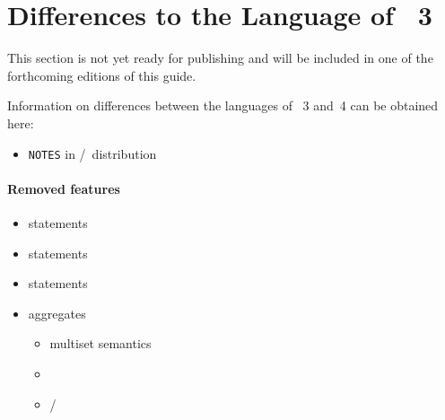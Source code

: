 \section{Differences to the Language of \gringo~3}\label{sec:gringo:tri}

This section is not yet ready for publishing
and will be included in one of the forthcoming editions of this guide.

Information on differences between the languages of \gringo~3 and~4 can be obtained here:
\begin{itemize}
\item \texttt{NOTES} in \gringo/\clingo\ distribution
\end{itemize}

\paragraph{Removed features}
\begin{itemize}
\item {}    statements
\item {}  statements
\item {} statements
\item aggregates
  \begin{itemize}
  \item multiset semantics
  \item {} 
  \item {}/ 
  \end{itemize}
\end{itemize}


